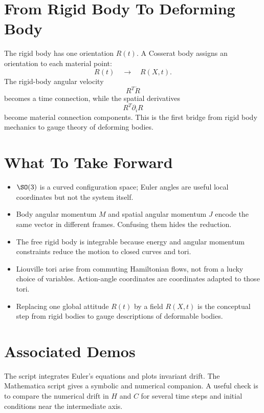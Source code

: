 \section{From Rigid Body To Deforming Body}
\label{sec:rigid-to-deforming}

The rigid body has one orientation \(R(t)\). A Cosserat body assigns an
orientation to each material point:
\[
  R(t)
  \quad\longrightarrow\quad
  R(X,t).
\]
The rigid-body angular velocity
\[
  R^T\dot R
\]
becomes a time connection, while the spatial derivatives
\[
  R^T\partial_iR
\]
become material connection components. This is the first bridge from rigid body
mechanics to gauge theory of deforming bodies.

\section{What To Take Forward}
\label{sec:rigid-take-forward}

\begin{itemize}
\item \(\SO(3)\) is a curved configuration space; Euler angles are useful local
coordinates but not the system itself.
\item Body angular momentum \(M\) and spatial angular momentum \(J\) encode the
same vector in different frames. Confusing them hides the reduction.
\item The free rigid body is integrable because energy and angular momentum
constraints reduce the motion to closed curves and tori.
\item Liouville tori arise from commuting Hamiltonian flows, not from a lucky
choice of variables. Action-angle coordinates are coordinates adapted to those
tori.
\item Replacing one global attitude \(R(t)\) by a field \(R(X,t)\) is the
conceptual step from rigid bodies to gauge descriptions of deformable bodies.
\end{itemize}

\section{Associated Demos}
\label{sec:rigid-associated-demos}

The script  integrates Euler's
equations and plots invariant drift. The Mathematica script
 gives a symbolic and numerical
companion. A useful check is to compare the numerical drift in \(H\) and \(C\)
for several time steps and initial conditions near the intermediate axis.
